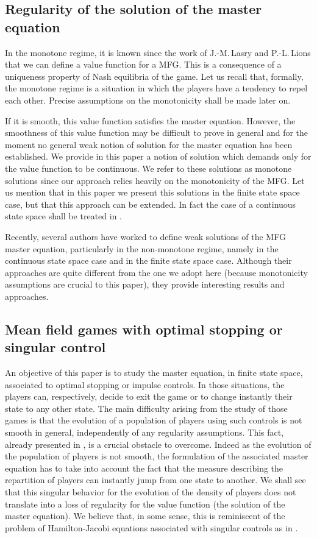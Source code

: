 \documentclass[10pt]{amsart}
\theoremstyle{definition}
\begin{document}
\subsection*{Regularity of the solution of the master equation}
In the monotone regime, it is known since the work of J.-M.\,Lasry and P.-L.\,Lions that we can define a value function for a MFG. This is a consequence of a uniqueness property of Nash equilibria of the game. Let us recall that, formally, the monotone regime is a situation in which the players have a tendency to repel each other. Precise assumptions on the monotonicity shall be made later on.

If it is smooth, this value function satisfies the master equation. However, the smoothness of this value function may be difficult to prove in general \cite{cardaliaguet2019master} and for the moment no general weak notion of solution for the master equation has been established. We provide in this paper a notion of solution which demands only for the value function to be continuous. We refer to these solutions as monotone solutions since our approach relies heavily on the monotonicity of the MFG. Let us mention that in this paper we present this solutions in the finite state space case, but that this approach can be extended. In fact the case of a continuous state space shall be treated in \cite{bertucci2020forthcomming}.

Recently, several authors have worked to define weak solutions of the MFG master equation, particularly in the non-monotone regime, namely \cite{mou,gangbo,zhang} in the continuous state space case and \cite{cecchin2019convergence} in the finite state space case. Although their approaches are quite different from the one we adopt here (because monotonicity assumptions are crucial to this paper), they provide interesting results and approaches.

\subsection*{Mean field games with optimal stopping or singular control}
An objective of this paper is to study the master equation, in finite state space, associated to optimal stopping or impulse controls. In those situations, the players can, respectively, decide to exit the game or to change instantly their state to any other state. The main difficulty arising from the study of those games is that the evolution of a population of players using such controls is not smooth in general, independently of any regularity assumptions. This fact, already presented in \cite{bertucci2018optimal,bertucci2020fokker}, is a crucial obstacle to overcome. Indeed as the evolution of the population of players is not smooth, the formulation of the associated master equation has to take into account the fact that the measure describing the repartition of players can instantly jump from one state to another. We shall see that this singular behavior for the evolution of the density of players does not translate into a loss of regularity for the value function (\ie the solution of the master equation). We believe that, in some sense, this is reminiscent of the problem of Hamilton-Jacobi equations associated with singular controls as in \cite{lasry2000classe}.
\end{document}
